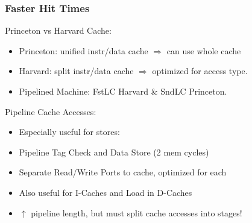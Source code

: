 \documentclass{beamer}
\begin{document}
\begin{frame}[fragile,t]
\frametitle{Faster Hit Times}

Princeton vs Harvard Cache:
\begin{itemize}
    \item Princeton: unified instr/data cache $\Rightarrow$ can use whole cache 
    \item Harvard: split instr/data cache $\Rightarrow$ optimized for access type.
    \item Pipelined Machine: FstLC Harvard \& SndLC Princeton.\bigskip
\end  {itemize}

Pipeline Cache Accesses:
\begin{itemize}
    \item Especially useful for stores:
    \item Pipeline Tag Check and Data Store (2 mem cycles)
    \item Separate Read/Write Ports to cache, optimized for each
    \item Also useful for I-Caches and Load in D-Caches
    \item $\uparrow$ pipeline length, but must split cache accesses into stages!
\end  {itemize}
\end{frame}
\end{document}
